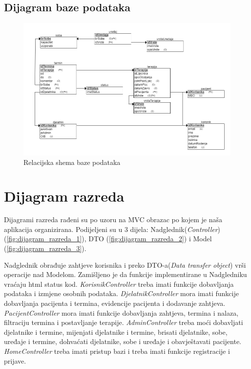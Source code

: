 			\subsection{Dijagram baze podataka}
		\begin{figure}[H]
			\includegraphics[width=\textwidth]{slike/Relacijska_shema.PNG} %
			\caption{Relacijska shema baze podataka}
			\label{fig:relacijska_shema1} %
		\end{figure}
			
		\section{Dijagram razreda}
		
			Dijagrami razreda rađeni su po uzoru na MVC obrazac po kojem je naša aplikacija organizirana. Podijeljeni su u 3 dijela: Nadglednik(\textit{Controller}) (\ref{fig:dijagram_razreda_1}), DTO (\ref{fig:dijagram_razreda_2}) i Model (\ref{fig:dijagram_razreda_3}).
			
			Nadglednik obrađuje zahtjeve korisnika i preko DTO-a(\textit{Data transfer object}) vrši operacije nad Modelom. Zamišljeno je da funkcije implementirane u Nadgledniku vraćaju html status kod. \textit{KorisnikController} treba imati funkcije dobavljanja podataka i izmjene osobnih podataka. \textit{DjelatnikController} mora imati funkcije dobavljanja pacijenta i termina, evidencije pacijenta i dodavanje zahtjeva. \textit{PacijentController} mora imati funkcije dobavljanja zahtjeva, termina i nalaza, filtraciju termina i postavljanje terapije. \textit{AdminController} treba moći dobavljati djelatnike i termine, mijenjati djelatnike i termine, brisati djelatnike, sobe, uređaje i termine, dohvaćati djelatnike, sobe i uređaje i obavještavati pacijente. \textit{HomeController} treba imati pristup bazi i treba imati funkcije registracije i prijave.
			
